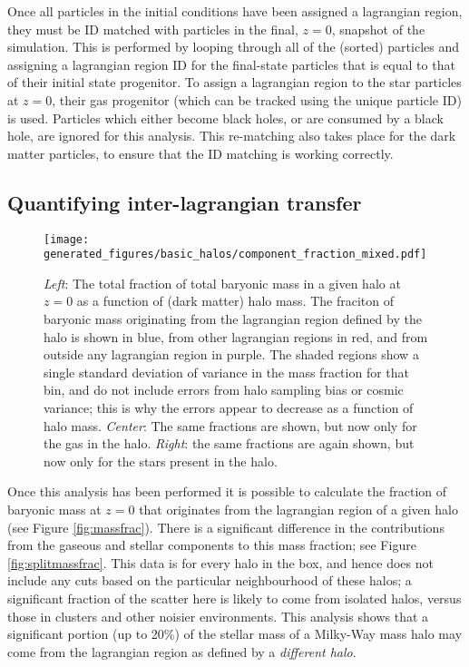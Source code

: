 Once all particles in the initial conditions have been assigned a lagrangian
region, they must be ID matched with particles in the final, $z=0$, snapshot of
the simulation. This is performed by looping through all of the (sorted)
particles and assigning a lagrangian region ID for the final-state particles
that is equal to that of their initial state progenitor. To assign a
lagrangian region to the star particles at $z=0$, their gas progenitor
(which can be tracked using the unique particle ID) is used. Particles which
either become black holes, or are consumed by a black hole, are ignored for
this analysis. This re-matching also takes place for the dark matter
particles, to ensure that the ID matching is working correctly.

\subsection{Quantifying inter-lagrangian transfer}

\begin{figure*}
	\centering
	\texttt{[image: generated\_figures/basic\_halos/component\_fraction\_mixed.pdf]}
	\caption{
		\emph{Left}: The total fraction of total baryonic mass in a given halo at
		$z=0$ as a function of (dark matter) halo mass. The fraciton of baryonic
		mass originating from the lagrangian region defined by the halo is shown
		in blue, from other lagrangian regions in red, and from outside any
		lagrangian region in purple. The shaded regions show a single standard
		deviation of variance in the mass fraction for that bin, and do not include
		errors from halo sampling bias or cosmic variance; this is why the errors
		appear to decrease as a function of halo mass. \emph{Center}: The same 
		fractions are shown, but now only for the gas in the halo. \emph{Right}:
		the same fractions are again shown, but now only for the stars present in
		the halo.
	}
	\label{fig:massfracall}
\end{figure*}

Once this analysis has been performed it is possible to calculate the fraction of
baryonic mass at $z=0$ that originates from the lagrangian region of a given
halo (see Figure \ref{fig:massfrac}). There is a significant difference in the
contributions from the gaseous and stellar components to this mass fraction;
see Figure \ref{fig:splitmassfrac}. This data is for every halo in the box, and
hence does not include any cuts based on the particular neighbourhood of these
halos; a significant fraction of the scatter here is likely to come from
isolated halos, versus those in clusters and other noisier environments. This
analysis shows that a significant portion (up to 20\%) of the stellar mass of a
Milky-Way mass halo may come from the lagrangian region as defined by a
\emph{different halo}.

